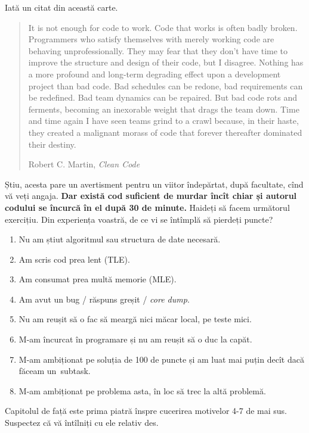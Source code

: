 \documentclass[../main.tex]{subfiles}
\begin{document}
Iată un citat din această carte.

\begin{quote}
  It is not enough for code to work. Code that works is often badly broken. Programmers who satisfy themselves with merely working code are behaving unprofessionally. They may fear that they don’t have time to improve the structure and design of their code, but I disagree. Nothing has a more profound and long-term degrading effect upon a development project than bad code. Bad schedules can be redone, bad requirements can be redeﬁned. Bad team dynamics can be repaired. But bad code rots and ferments, becoming an inexorable weight that drags the team down. Time and time again I have seen teams grind to a crawl because, in their haste, they created a malignant morass of code that forever thereafter dominated their destiny.

  \begin{flushright}
    Robert C. Martin, \textit{Clean Code}
  \end{flushright}
\end{quote}

Știu, acesta pare un avertisment pentru un viitor îndepărtat, după facultate, cînd vă veți angaja. \textbf{Dar există cod suficient de murdar încît chiar și autorul codului se încurcă în el după 30 de minute.} Haideți să facem următorul exercițiu. Din experiența voastră, de ce vi se întîmplă să pierdeți puncte?

\begin{enumerate}
  \item Nu am știut algoritmul sau structura de date necesară.
  \item Am scris cod prea lent (TLE).
  \item Am consumat prea multă memorie (MLE).
  \item Am avut un bug / răspuns greșit / \textit{core dump}.
  \item Nu am reușit să o fac să meargă nici măcar local, pe teste mici.
  \item M-am încurcat în programare și nu am reușit să o duc la capăt.
  \item M-am ambiționat pe soluția de 100 de puncte și am luat mai puțin decît dacă făceam un subtask.
  \item M-am ambiționat pe problema asta, în loc să trec la altă problemă.
\end{enumerate}

Capitolul de față este prima piatră înspre cucerirea motivelor 4-7 de mai sus. Suspectez că vă întîlniți cu ele relativ des.
\end{document}
